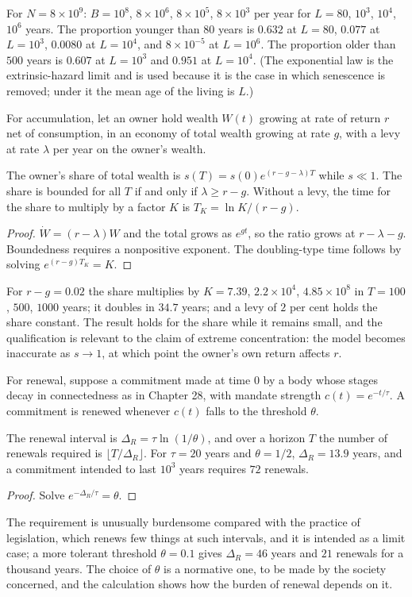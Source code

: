 For $N=8\times10^9$: $B=10^8$, $8\times10^6$, $8\times10^5$, $8\times10^3$ per year for $L=80$, $10^3$, $10^4$, $10^6$ years. The proportion younger than $80$ years is $0.632$ at $L=80$, $0.077$ at $L=10^3$, $0.0080$ at $L=10^4$, and $8\times10^{-5}$ at $L=10^6$. The proportion older than $500$ years is $0.607$ at $L=10^3$ and $0.951$ at $L=10^4$. (The exponential law is the extrinsic-hazard limit and is used because it is the case in which senescence is removed; under it the mean age of the living is $L$.)

For accumulation, let an owner hold wealth $W(t)$ growing at rate of return $r$ net of consumption, in an economy of total wealth growing at rate $g$, with a levy at rate $\lambda$ per year on the owner's wealth.

\begin{proposition}
The owner's share of total wealth is $s(T)=s(0)e^{(r-g-\lambda)T}$ while $s\ll1$. The share is bounded for all $T$ if and only if $\lambda\ge r-g$. Without a levy, the time for the share to multiply by a factor $K$ is $T_K=\ln K/(r-g)$.
\end{proposition}

\begin{proof}
$\dot W=(r-\lambda)W$ and the total grows as $e^{gt}$, so the ratio grows at $r-\lambda-g$. Boundedness requires a nonpositive exponent. The doubling-type time follows by solving $e^{(r-g)T_K}=K$.
\end{proof}

For $r-g=0.02$ the share multiplies by $K=7.39$, $2.2\times10^4$, $4.85\times10^8$ in $T=100$, $500$, $1000$ years; it doubles in $34.7$ years; and a levy of $2$ per cent holds the share constant. The result holds for the share while it remains small, and the qualification is relevant to the claim of extreme concentration: the model becomes inaccurate as $s\to1$, at which point the owner's own return affects $r$.

For renewal, suppose a commitment made at time $0$ by a body whose stages decay in connectedness as in Chapter 28, with mandate strength $c(t)=e^{-t/\tau}$. A commitment is renewed whenever $c(t)$ falls to the threshold $\theta$.

\begin{proposition}
The renewal interval is $\Delta_R=\tau\ln(1/\theta)$, and over a horizon $T$ the number of renewals required is $\lfloor T/\Delta_R\rfloor$. For $\tau=20$ years and $\theta=1/2$, $\Delta_R=13.9$ years, and a commitment intended to last $10^3$ years requires $72$ renewals.
\end{proposition}

\begin{proof}
Solve $e^{-\Delta_R/\tau}=\theta$.
\end{proof}

The requirement is unusually burdensome compared with the practice of legislation, which renews few things at such intervals, and it is intended as a limit case; a more tolerant threshold $\theta=0.1$ gives $\Delta_R=46$ years and $21$ renewals for a thousand years. The choice of $\theta$ is a normative one, to be made by the society concerned, and the calculation shows how the burden of renewal depends on it.
